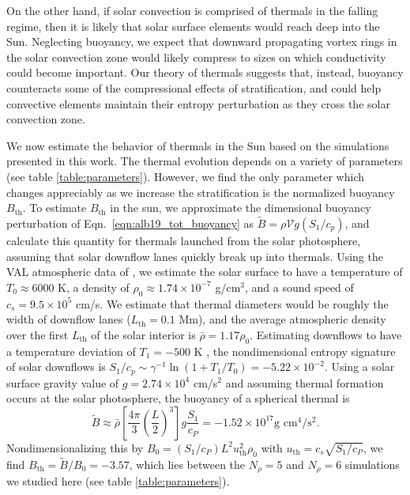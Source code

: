 On the other hand, if solar convection is comprised of thermals in the falling regime, then it is likely that solar surface elements would reach deep into the Sun.
Neglecting buoyancy, we expect that downward propagating vortex rings in the solar convection zone would likely compress to sizes on which conductivity could become important.
Our theory of thermals suggests that, instead, buoyancy counteracts some of the compressional effects of stratification, and could help convective elements maintain their entropy perturbation as they cross the solar convection zone.

We now estimate the behavior of thermals in the Sun based on the simulations presented in this work.
The thermal evolution depends on a variety of parameters (see table \ref{table:parameters}).
However, we find the only parameter which changes appreciably as we increase the stratification is the normalized buoyancy $B_\text{th}$.
To estimate $B_\text{th}$ in the sun, we approximate the dimensional buoyancy perturbation of Eqn.~\ref{eqn:alb19_tot_buoyancy} as $\tilde{B} = \rho \mathcal{V} g (S_1/c_p)$, and calculate this quantity for thermals launched from the solar photosphere, assuming that solar downflow lanes quickly break up into thermals.
Using the VAL atmospheric data of \cite{avrett&loeser2008}, we estimate the solar surface to have a temperature of $T_0 \approx 6000$ K, a density of $\rho_0 \approx 1.74 \times 10^{-7}$ g/cm$^3$, and a sound speed of $c_s = 9.5 \times 10^5$ cm/s.
We estimate that thermal diameters would be roughly the width of downflow lanes ($L_{\text{th}} = 0.1$ Mm), and the average atmospheric density over the first $L_{\text{th}}$ of the solar interior is $\bar{\rho} = 1.17\rho_0$.
Estimating downflows to have a temperature deviation of $T_1 = -500$ K \cite{borrero&bellotrubio2002}, the nondimensional entropy signature of solar downflows is $S_1/c_p \sim \gamma^{-1}\ln(1 + T_1/T_0) = -5.22 \times 10^{-2}$.
Using a solar surface gravity value of $g = 2.74 \times 10^4$ cm/s$^2$ and assuming thermal formation occurs at the solar photosphere, the buoyancy of a spherical thermal is 
$$
\tilde{B} \approx \bar{\rho}\left[\frac{4\pi}{3} \left(\frac{L}{2}\right)^3\right] g \frac{S_1}{c_P} = -1.52 \times 10^{17} \text{g cm}^4/\text{s}^2.
$$
Nondimensionalizing this by $B_0 = (S_1/c_P) L^2 u_{\text{th}}^2 \rho_0$ with $u_{\text{th}} = c_s \sqrt{S_1/c_P}$, we find $B_\text{th} = \tilde{B}/B_0 = -3.57$, which lies between the $N_\rho = 5$ and $N_\rho = 6$ simulations we studied here (see table \ref{table:parameters}).

